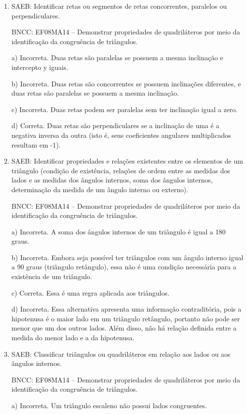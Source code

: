 \begin{enumerate}
\item SAEB: Identificar retas ou segmentos de retas concorrentes, paralelos ou
perpendiculares.

BNCC: EF08MA14 -- Demonstrar propriedades de quadriláteros por meio da
identificação da congruência de triângulos.

a) Incorreta. Duas retas são paralelas se possuem a mesma
inclinação e intercepto y iguais.

b) Incorreta. Duas retas são concorrentes se possuem inclinações
diferentes, e duas retas são paralelas se possuem a mesma inclinação.

c) Incorreta. Duas retas podem ser paralelas sem ter inclinação
igual a zero.

d) Correta. Duas retas são perpendiculares se a inclinação de uma é a
negativa inversa da outra (isto é, seus coeficientes angulares
multiplicados resultam em -1).

\item SAEB: Identificar propriedades e relações existentes entre os elementos
de um triângulo (condição de existência, relações de ordem entre as
medidas dos lados e as medidas dos ângulos internos, soma dos ângulos
internos, determinação da medida de um ângulo interno ou externo).

BNCC: EF08MA14 -- Demonstrar propriedades de quadriláteros por meio da
identificação da congruência de triângulos.

a) Incorreta. A soma dos ângulos internos de um triângulo é igual a
180 graus.

b) Incorreta. Embora seja possível ter triângulos com um ângulo
interno igual a 90 graus (triângulo retângulo), essa não é uma condição
necessária para a existência de um triângulo.

c) Correta. Essa é uma regra aplicada aos triângulos.

d) Incorreta. Essa alternativa apresenta uma informação
contraditória, pois a hipotenusa é o maior lado em um triângulo
retângulo, portanto não pode ser menor que um dos outros lados. Além
disso, não há relação definida entre a medida do menor lado e a da
hipotenusa.

\item SAEB: Classificar triângulos ou quadriláteros em relação aos lados ou
aos ângulos internos.

BNCC: EF08MA14 -- Demonstrar propriedades de quadriláteros por meio da
identificação da congruência de triângulos.

a) Incorreta. Um triângulo escaleno não possui lados congruentes.


\end{enumerate}
